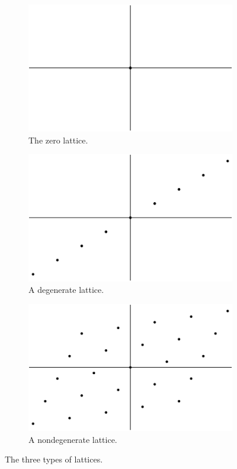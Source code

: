 \documentclass[12pt,twoside]{reedthesis}
\theoremstyle{definition}
\begin{document}
\begin{figure}[h]
  \centering
  \begin{subfigure}[t]{0.31\textwidth}
    \centering
    \includegraphics[width=\textwidth]{figures/zero_lattice.pdf}
    \caption{The zero lattice.}
  \end{subfigure}
  \hfill
  \begin{subfigure}[t]{0.31\textwidth}
    \centering
    \includegraphics[width=\textwidth]{figures/degen_lattice.pdf}
    \caption{A degenerate lattice.}
  \end{subfigure}
  \hfill
  \begin{subfigure}[t]{0.31\textwidth}
    \centering
    \includegraphics[width=\textwidth]{figures/non_degen_lattice.pdf}
    \caption{A nondegenerate lattice.}
  \end{subfigure}
  \caption{The three types of lattices.}
  \label{fig:three_types_of_lattices}
\end{figure}
\end{document}
